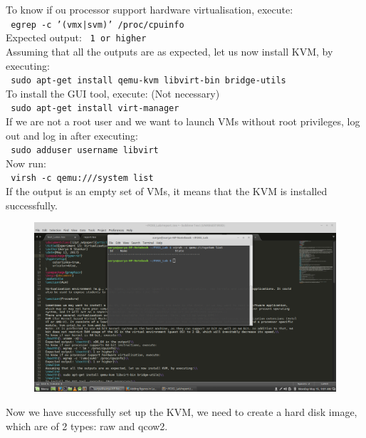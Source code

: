 \documentclass[12pt,a4paper]{article}
\begin{document}
To know if ou processor support hardware virtualisation, execute:\\
\texttt{\ egrep -c '(vmx|svm)' /proc/cpuinfo}\\
Expected output: \texttt{\ 1 or higher}\\
\newline
Assuming that all the outputs are as expected, let us now install KVM, by executing:\\
\newline
\texttt{\ sudo apt-get install qemu-kvm libvirt-bin bridge-utils}\\
\newline
To install the GUI tool, execute: (Not necessary)\\
\newline
\texttt{\ sudo apt-get install virt-manager}\\
\newline
If we are not a root user and we want to launch VMs without root privileges, log out and log in after executing:\\
\newline
\texttt{\ sudo adduser username libvirt}\\
\newline
Now run:\\
\newline
\texttt{\ virsh -c qemu:///system list}\\
\newline
If the output is an empty set of VMs, it means that the KVM is installed successfully.\\
\begin{figure}[h]
\includegraphics[width=\textwidth]{KVMSetUpSuccess}
\centering
\end{figure}
\newline
Now we have successfully set up the KVM, we need to create a hard disk image, which are of 2 types: raw and qcow2.\\
\end{document}
